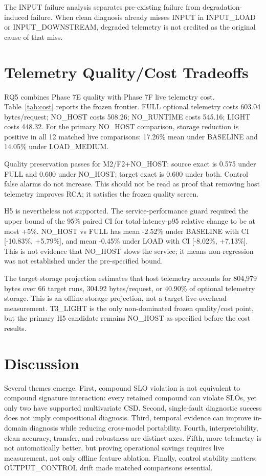 \documentclass[11pt]{article}
\begin{document}


The INPUT failure analysis separates pre-existing failure from degradation-induced failure. When clean diagnosis already misses INPUT in INPUT\_LOAD or INPUT\_DOWNSTREAM, degraded telemetry is not credited as the original cause of that miss.

\section{Telemetry Quality/Cost Tradeoffs}
RQ5 combines Phase 7E quality with Phase 7F live telemetry cost. Table~\ref{tab:cost} reports the frozen frontier. FULL optional telemetry costs 603.04 bytes/request; NO\_HOST costs 508.26; NO\_RUNTIME costs 545.16; LIGHT costs 448.32. For the primary NO\_HOST comparison, storage reduction is positive in all 12 matched live comparisons: 17.26\% mean under BASELINE and 14.05\% under LOAD\_MEDIUM.



Quality preservation passes for M2/F2+NO\_HOST: source exact is 0.575 under FULL and 0.600 under NO\_HOST; target exact is 0.600 under both. Control false alarms do not increase. This should not be read as proof that removing host telemetry improves RCA; it satisfies the frozen quality screen.

H5 is nevertheless not supported. The service-performance guard required the upper bound of the 95\% paired CI for total-latency-p95 relative change to be at most +5\%. NO\_HOST vs FULL has mean -2.52\% under BASELINE with CI [-10.83\%, +5.79\%], and mean -0.45\% under LOAD with CI [-8.02\%, +7.13\%]. This is not evidence that NO\_HOST slows the service; it means non-regression was not established under the pre-specified bound.

The target storage projection estimates that host telemetry accounts for 804,979 bytes over 66 target runs, 304.92 bytes/request, or 40.90\% of optional telemetry storage. This is an offline storage projection, not a target live-overhead measurement. T3\_LIGHT is the only non-dominated frozen quality/cost point, but the primary H5 candidate remains NO\_HOST as specified before the cost results.

\section{Discussion}
Several themes emerge. First, compound SLO violation is not equivalent to compound signature interaction: every retained compound can violate SLOs, yet only two have supported multivariate CSD. Second, single-fault diagnostic success does not imply compositional diagnosis. Third, temporal evidence can improve in-domain diagnosis while reducing cross-model portability. Fourth, interpretability, clean accuracy, transfer, and robustness are distinct axes. Fifth, more telemetry is not automatically better, but proving operational savings requires live measurement, not only offline feature ablation. Finally, control stability matters: OUTPUT\_CONTROL drift made matched comparisons essential.
\end{document}
